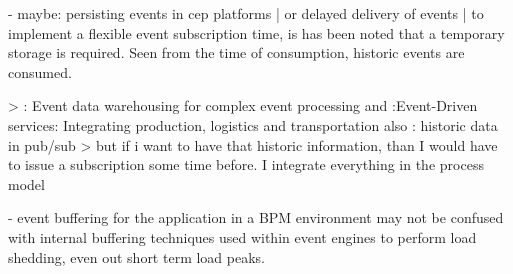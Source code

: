 - maybe: persisting events in cep platforms | or delayed delivery of events | 
to implement a flexible event subscription time, is has been noted that a temporary storage is required. Seen from the time of consumption, historic events are consumed.

> \cite{roth2010event}: Event data warehousing for complex event processing and \cite{buchmann2010event}:Event-Driven services: Integrating production, logistics and transportation
also \cite{li2007historic}: historic data in pub/sub
> but if i want to have that historic information, than I would have to issue a subscription some time before. I integrate everything in the process model

- event buffering for the application in a BPM environment may not be confused with internal buffering techniques used within event engines to perform load shedding, even out short term load peaks. 

